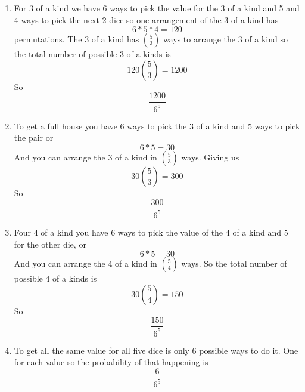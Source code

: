 \documentclass[11pt]{article}
\begin{document}
\begin{enumerate}
\begin{enumerate}
\item
For 3 of a kind we have 6 ways to pick the value for the 3 of a kind and 5 and 4 ways to pick the next 2 dice so one arrangement of the 3 of a kind has
$$6*5*4=120$$
permutations. The 3 of a kind has $5\choose3$ ways to arrange the 3 of a kind so the total number of possible 3 of a kinds is
$$120{5\choose3}=1200$$
So
$$\frac{1200}{6^5}$$  
\begin{center}
\end{center}

\item
To get a full house you have 6 ways to pick the 3 of a kind and 5 ways to pick the pair or
$$6*5=30$$
And you can arrange the 3 of a kind in $5\choose3$ ways. Giving us
$$30{5\choose3} = 300$$
So
$$\frac{300}{6^5}$$
\begin{center}
\end{center}

\item
Four 4 of a kind you have 6 ways to pick the value of the 4 of a kind and 5 for the other die, or
$$6*5=30$$
And you can arrange the 4 of a kind in $5\choose4$ ways. So the total number of possible 4 of a kinds is
$$30{5\choose4}=150$$
So
$$\frac{150}{6^5}$$
\begin{center}
\end{center}

\item
To get all the same value for all five dice is only 6 possible ways to do it. One for each value so the probability of that happening is
$$\frac{6}{6^5}$$
\begin{center}
\end{center}
\end{enumerate}


\end{enumerate}
\end{document}
